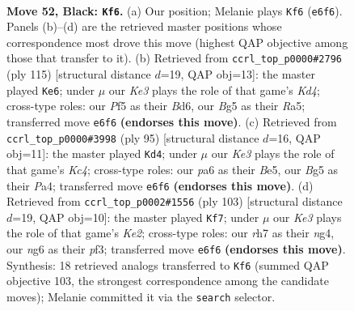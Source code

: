 \documentclass[11pt]{article}
\begin{document}
\clearpage

\begin{figure}[p]\centering
\begin{subfigure}{0.46\textwidth}\centering
\resizebox{\linewidth}{!}{%
\newchessgame
\chessboard[
  setfen={5B2/p6R/P3k1N1/1P3pb1/3K4/8/8/8 b - - 11 52},
  showmover=false,
  pgfstyle=straightmove, color=movearrow, markmove={e6-f6}
]}
\caption{}
\end{subfigure}\hfill
\begin{subfigure}{0.46\textwidth}\centering
\resizebox{\linewidth}{!}{%
\newchessgame
\chessboard[
  setfen={8/8/3b4/rp1k1p1P/8/3N4/4P1K1/1R6 b - - 2 58},
  showmover=false,
  pgfstyle=straightmove, color=movearrow, markmove={d5-e6}
]}
\caption{}
\end{subfigure}
\\[4pt]
\begin{subfigure}{0.46\textwidth}\centering
\resizebox{\linewidth}{!}{%
\newchessgame
\chessboard[
  setfen={8/8/8/2k1b1P1/pp2p2R/8/P2K4/8 b - - 0 48},
  showmover=false,
  pgfstyle=straightmove, color=movearrow, markmove={c5-d4}
]}
\caption{}
\end{subfigure}\hfill
\begin{subfigure}{0.46\textwidth}\centering
\resizebox{\linewidth}{!}{%
\newchessgame
\chessboard[
  setfen={8/4k3/4p2p/2K3pP/6N1/5Pb1/8/8 b - - 3 52},
  showmover=false,
  pgfstyle=straightmove, color=movearrow, markmove={e7-f7}
]}
\caption{}
\end{subfigure}
\caption{\textbf{Move 52, Black: \texttt{Kf6}.} (a) Our position; Melanie plays \texttt{Kf6} (\texttt{e6f6}). Panels (b)--(d) are the retrieved master positions whose correspondence most drove this move (highest QAP objective among those that transfer to it). (b) Retrieved from \texttt{ccrl\_top\_p0000\#2796} (ply 115) [structural distance $d$=19, QAP obj=13]: the master played \texttt{Ke6}; under $\mu$ our \emph{Ke3} plays the role of that game's \emph{Kd4}; cross-type roles: our \emph{P}f5 as their \emph{B}d6, our \emph{B}g5 as their \emph{R}a5; transferred move \texttt{e6f6} \textbf{(endorses this move)}. (c) Retrieved from \texttt{ccrl\_top\_p0000\#3998} (ply 95) [structural distance $d$=16, QAP obj=11]: the master played \texttt{Kd4}; under $\mu$ our \emph{Ke3} plays the role of that game's \emph{Kc4}; cross-type roles: our \emph{p}a6 as their \emph{B}e5, our \emph{B}g5 as their \emph{P}a4; transferred move \texttt{e6f6} \textbf{(endorses this move)}. (d) Retrieved from \texttt{ccrl\_top\_p0002\#1556} (ply 103) [structural distance $d$=19, QAP obj=10]: the master played \texttt{Kf7}; under $\mu$ our \emph{Ke3} plays the role of that game's \emph{Ke2}; cross-type roles: our \emph{r}h7 as their \emph{n}g4, our \emph{n}g6 as their \emph{p}f3; transferred move \texttt{e6f6} \textbf{(endorses this move)}. Synthesis: 18 retrieved analogs transferred to \texttt{Kf6} (summed QAP objective 103, the strongest correspondence among the candidate moves); Melanie committed it via the \texttt{search} selector.}
\label{fig:thought-m103}
\end{figure}
\end{document}
